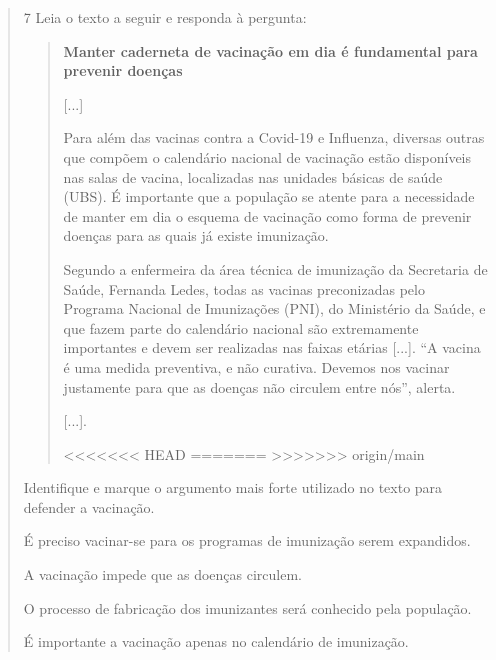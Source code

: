 \begin{quote}
\num{7} Leia o texto a seguir e responda à pergunta:

\begin{quote}
\textbf{Manter caderneta de vacinação em dia é fundamental para prevenir
doenças}

{[}...{]}

Para além das vacinas contra a Covid-19 e Influenza, diversas outras que
compõem o calendário nacional de vacinação estão disponíveis nas salas
de vacina, localizadas nas unidades básicas de saúde (UBS). É importante
que a população se atente para a necessidade de manter em dia o esquema
de vacinação como forma de prevenir doenças para as quais já existe
imunização.

Segundo a enfermeira da área técnica de imunização da Secretaria de
Saúde, Fernanda Ledes, todas as vacinas preconizadas pelo Programa
Nacional de Imunizações (PNI), do Ministério da Saúde, e que fazem parte
do calendário nacional são extremamente importantes e devem ser
realizadas nas faixas etárias {[}...{]}. “A vacina é uma medida
preventiva, e não curativa. Devemos nos vacinar justamente para que as
doenças não circulem entre nós”, alerta.

{[}...{]}.

<<<<<<< HEAD
=======
>>>>>>> origin/main
\end{quote}

Identifique e marque o argumento mais forte utilizado no texto para defender a
vacinação.

\begin{escolha}
\item É preciso vacinar-se para os programas de imunização serem expandidos.

\item A vacinação impede que as doenças circulem.

\item O processo de fabricação dos imunizantes será conhecido pela população.

\item É importante a vacinação apenas no calendário de imunização.
\end{escolha}


\end{quote}

